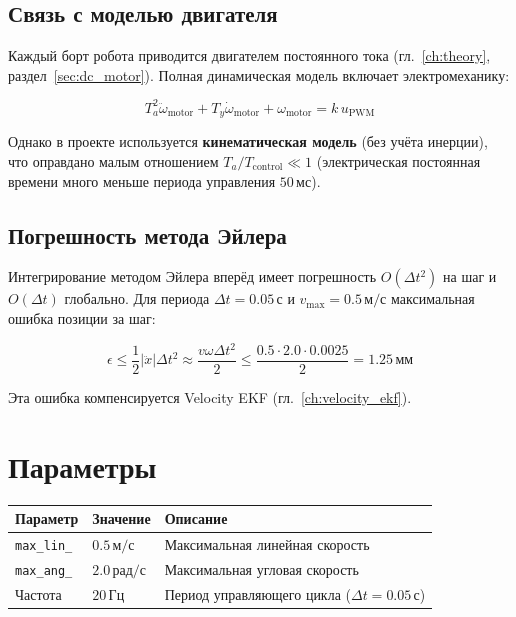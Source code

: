 \subsection{Связь с моделью двигателя}

Каждый борт робота приводится двигателем постоянного тока
(гл.~\ref{ch:theory}, раздел~\ref{sec:dc_motor}). Полная
динамическая модель включает электромеханику:

\begin{equation}
  T_a^2\ddot{\omega}_{\text{motor}} + T_y\dot{\omega}_{\text{motor}} + \omega_{\text{motor}} = k\,u_{\text{PWM}}
  \label{eq:motor_dynamics}
\end{equation}

Однако в проекте используется \textbf{кинематическая модель}
(без учёта инерции), что оправдано малым отношением
$T_a/T_{\text{control}} \ll 1$ (электрическая постоянная времени
много меньше периода управления $50\,\text{мс}$).

\subsection{Погрешность метода Эйлера}

Интегрирование методом Эйлера вперёд имеет погрешность $O(\Delta t^2)$
на шаг и $O(\Delta t)$ глобально. Для периода $\Delta t = 0.05\,\text{с}$
и $v_{\max} = 0.5\,\text{м/с}$ максимальная ошибка позиции за шаг:

\begin{equation}
  \epsilon \leq \frac{1}{2}|\ddot{x}|\Delta t^2 \approx \frac{v\omega\Delta t^2}{2}
  \leq \frac{0.5 \cdot 2.0 \cdot 0.0025}{2} = 1.25\,\text{мм}
  \label{eq:euler_error}
\end{equation}

Эта ошибка компенсируется Velocity EKF (гл.~\ref{ch:velocity_ekf}).

\section{Параметры}

\begin{center}
\begin{tabular}{lll}
\toprule
\textbf{Параметр} & \textbf{Значение} & \textbf{Описание}\\
\midrule
\texttt{max\_lin\_} & $0.5\,\text{м/с}$ & Максимальная линейная скорость\\
\texttt{max\_ang\_} & $2.0\,\text{рад/с}$ & Максимальная угловая скорость\\
Частота & $20\,\text{Гц}$ & Период управляющего цикла ($\Delta t = 0.05\,\text{с}$)\\
\bottomrule
\end{tabular}
\end{center}
